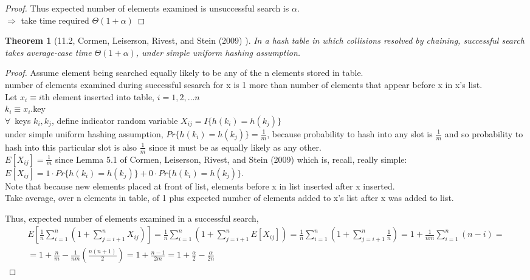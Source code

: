 \documentclass[10pt]{amsart}
\newtheorem{theorem}{Theorem}
\begin{document}
\begin{multicols*}{2}
\begin{proof}
Thus expected number of elements examined is unsuccessful search is $\alpha$. \\
$\Longrightarrow $ take time required $\Theta(1+\alpha)$
\end{proof}


\begin{theorem}[11.2, Cormen, Leiserson, Rivest, and Stein (2009) \cite{CLRS2009}]
In a hash table in which collisions resolved by chaining, successful search takes average-case time $\Theta(1+\alpha)$, under simple uniform hashing assumption.	
\end{theorem}
\begin{proof}
Assume element being searched equally likely to be any of the n elements stored in table. \\
number of elements examined during successful sesarch for x is 1 more than number of elements that appear before x in x's list. \\
Let $x_i \equiv i$th element inserted into table, $i = 1, 2, \dots n$ \\
\phantom{Let } $k_i \equiv x_i$.key \\

$\forall \, $ keys $k_i, k_j$, define indicator random variable $X_{ij} = I\lbrace h(k_i) = h(k_j) \rbrace$ \\
under simple uniform hashing assumption, $Pr\lbrace h(k_i) = h(k_j) \rbrace = \frac{1}{m}$, because probability to hash into any slot is $\frac{1}{m}$ and so probability to hash into this particular slot is also $\frac{1}{m}$ since it must be as equally likely as any other. \\

$E[X_{ij}] = \frac{1}{m}$ since Lemma 5.1 of Cormen, Leiserson, Rivest, and Stein (2009) \cite{CLRS2009} which is, recall, really simple: $E[X_{ij}] = 1 \cdot Pr\lbrace h(k_i) = h(k_j) \rbrace + 0 \cdot Pr\lbrace h(k_i) = h(k_j) \rbrace$. \\

Note that because new elements placed at front of list, elements before x in list inserted after x inserted. \\

Take average, over n elements in table, of 1 plus expected number of elements added to x's list after x was added to list.

Thus, expected number of elements examined in a successful search,
\[
\begin{gathered}
E\left[ \frac{1}{n} \sum_{i=1}^n \left( 1 + \sum_{j={i+1}}^n X_{ij} \right) \right] = \frac{1}{n} \sum_{i=1}^n \left( 1 + \sum_{j=i+1}^n E[X_{ij}] \right) = \frac{1}{n} \sum_{i=1}^n \left( 1 + \sum_{j=i+1}^n \frac{1}{n} \right) = 1 + \frac{1}{nm} \sum_{i=1}^n (n-i) = \\
= 1 + \frac{n}{m} - \frac{1}{nm} \left( \frac{n (n+1) }{2} \right) = 1 + \frac{n-1}{2m} = 1 + \frac{\alpha}{2} - \frac{\alpha}{2n}
\end{gathered}
\]


\end{proof}
\end{multicols*}
\end{document}
